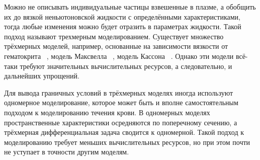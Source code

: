 Можно не описывать индивидуальные частицы взвешенные в плазме, а обобщить их до вязкой неньютоновской жидкости с определёнными 
характеристиками, тогда любые изменения можно будет отразить в параметрах жидкости. Такой подход называют трехмерным моделированием.
Существует множество трёхмерных моделей, например, основанные на зависимости вязкости от гематокрита ~\cite{walburn:1976},
модель Максвелла ~\cite{thurston:1972},  модель Кассона ~\cite{moller:2006}.
Однако эти модели всё-таки требуют значительных вычислительных ресурсов, а следовательно, и дальнейших упрощений. 

Для вывода граничных условий в трёхмерных моделях иногда используют одномерное моделирование, которое может быть 
и вполне самостоятельным подходом к моделированию течения крови.
В одномерных моделях пространственные характеристики осредняются по поперечному сечению, а трёхмерная дифференциальная
задача сводится к одномерной. Такой подход к моделированию требует меньших вычислительных ресурсов, но при этом почти не уступает в 
точности другим моделям.

